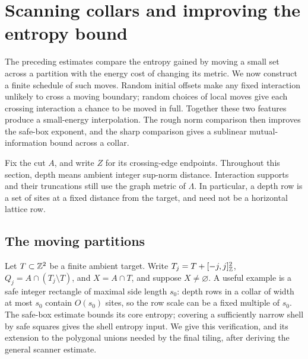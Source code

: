 \section{Scanning collars and improving the entropy bound}
\label{sec:scanner}

The preceding estimates compare the entropy gained by moving a small set
across a partition with the energy cost of changing its metric.  We now
construct a finite schedule of such moves.  Random initial offsets make
any fixed interaction unlikely to cross a moving boundary; random choices
of local moves give each crossing interaction a chance to be moved in full.
Together these two features produce a small-energy interpolation.
The rough norm comparison then improves the safe-box exponent, and the
sharp comparison gives a sublinear mutual-information bound across a collar.

Fix the cut \(A\), and write \(Z\) for its crossing-edge endpoints.
Throughout this section, depth means ambient integer sup-norm distance.
Interaction supports and their truncations still use the graph metric of
\(\Lambda\).  In particular, a depth row is a set of sites at a fixed
distance from the target, and need not be a horizontal lattice row.

\subsection{The moving partitions}

Let \(T\subset\mathbb Z^2\) be a finite ambient target.  Write
\(T_j=T+[-j,j]^2_{\mathbb Z}\), \(Q_j=A\cap(T_j\setminus T)\),
and \(X=A\cap T\), and suppose \(X\ne\varnothing\).
A useful example is a safe integer rectangle of maximal side length
\(s_0\): depth rows in a collar of width at most \(s_0\) contain
\(O(s_0)\) sites, so the row scale can be a fixed multiple of \(s_0\).
The safe-box estimate bounds its core entropy; covering a sufficiently
narrow shell by safe squares gives the shell entropy input.  We give
this verification, and its extension to the polygonal unions needed by
the final tiling, after deriving the general scanner estimate.

